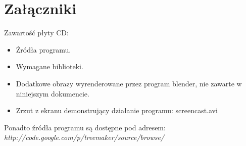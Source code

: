 \chapter*{Załączniki}
Zawartość płyty CD:
\begin{itemize}
	\item Źródła programu.
	\item Wymagane biblioteki.
	\item Dodatkowe obrazy wyrenderowane przez program blender, nie zawarte w niniejszym dokumencie.
	\item Zrzut z ekranu demonstrujący działanie programu: screencast.avi 
\end{itemize}
Ponadto źródła programu są dostępne pod adresem:\\
	\textit{http://code.google.com/p/treemaker/source/browse/}


